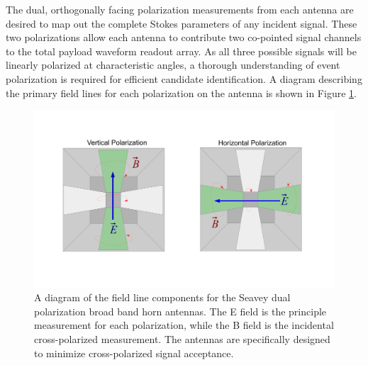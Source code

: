 	The dual, orthogonally facing polarization measurements from each antenna are desired to map out the complete Stokes parameters of any incident signal.  These two polarizations allow each antenna to contribute two co-pointed signal channels to the total payload waveform readout array.  As all three possible signals will be linearly polarized at characteristic angles, a thorough understanding of event polarization is required for efficient candidate identification.  A diagram describing the primary field lines for each polarization on the antenna is shown in Figure \ref{fig:AntennaPol}.  
	
\begin{figure}
\centering
	\includegraphics[width=\textwidth]{figures/AntennaPol}
	\caption{A diagram of the field line components for the Seavey dual polarization broad band horn antennas.  The E field is the principle measurement for each polarization, while the B field is the incidental cross-polarized measurement.  The antennas are specifically designed to minimize cross-polarized signal acceptance.}
	\label{fig:AntennaPol}
\end{figure}
		
	
	

